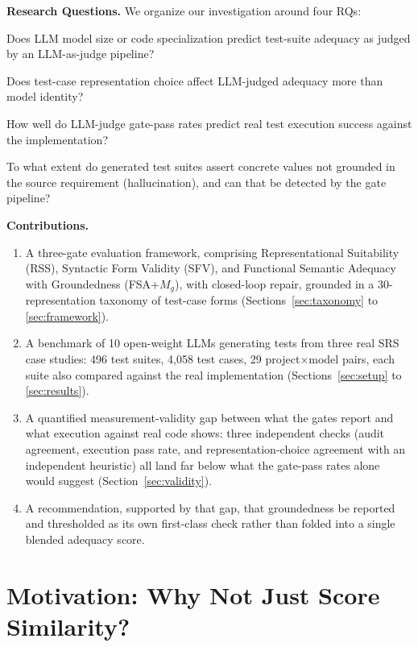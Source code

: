 \documentclass[conference]{IEEEtran}
\begin{document}
\textbf{Research Questions.} We organize our investigation around four RQs:
\begin{description}[leftmargin=0pt]
\item[\textbf{RQ1}] Does LLM model size or code specialization predict test-suite adequacy as judged by an LLM-as-judge pipeline?
\item[\textbf{RQ2}] Does test-case representation choice affect LLM-judged adequacy more than model identity?
\item[\textbf{RQ3}] How well do LLM-judge gate-pass rates predict real test execution success against the implementation?
\item[\textbf{RQ4}] To what extent do generated test suites assert concrete values not grounded in the source requirement (hallucination), and can that be detected by the gate pipeline?
\end{description}
\textbf{Contributions.}
\begin{enumerate}
\item A three-gate evaluation framework, comprising Representational
Suitability (RSS), Syntactic Form Validity (SFV), and Functional Semantic
Adequacy with Groundedness (FSA+$M_g$), with closed-loop repair, grounded in a
30-representation taxonomy of test-case forms (Sections~\ref{sec:taxonomy}
to \ref{sec:framework}).
\item A benchmark of 10 open-weight LLMs generating tests from three real SRS
case studies: 496 test suites, 4{,}058 test cases, 29 project$\times$model
pairs, each suite also compared against the real implementation
(Sections~\ref{sec:setup} to \ref{sec:results}).
\item A quantified measurement-validity gap between what the gates report and
what execution against real code shows: three independent checks (audit
agreement, execution pass rate, and representation-choice agreement with an
independent heuristic) all land far below what the gate-pass rates alone would
suggest (Section~\ref{sec:validity}).
\item A recommendation, supported by that gap, that groundedness be reported
and thresholded as its own first-class check rather than folded into a single
blended adequacy score.
\end{enumerate}

\section{Motivation: Why Not Just Score Similarity?}
\label{sec:motivation}
\end{document}
